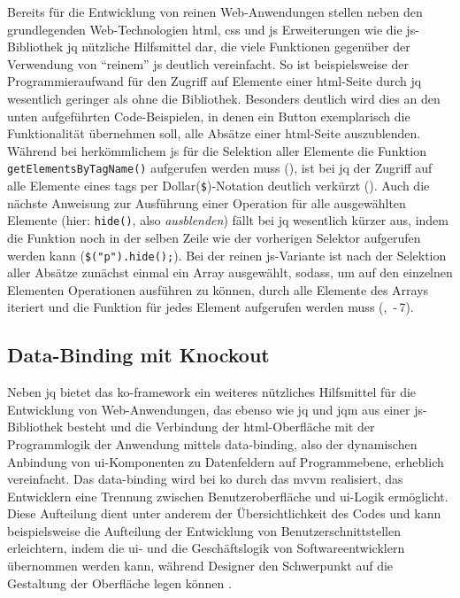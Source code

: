 Bereits für die Entwicklung von reinen Web-Anwendungen stellen neben den grundlegenden Web-Technologien \gls{html}, \gls{css} und \gls{js} Erweiterungen wie die \gls{js}-Bibliothek \gls{jq} nützliche Hilfsmittel dar, die viele Funktionen gegenüber der Verwendung von \enquote{reinem} \gls{js} deutlich vereinfacht.
So ist beispielsweise der Programmieraufwand für den Zugriff auf Elemente einer \gls{html}-Seite durch \gls{jq} wesentlich geringer als ohne die Bibliothek.
Besonders deutlich wird dies an den unten aufgeführten Code-Beispielen, in denen ein Button exemplarisch die Funktionalität übernehmen soll, alle Absätze einer \gls{html}-Seite auszublenden.
Während bei herkömmlichem \gls{js} für die Selektion aller Elemente die Funktion \lstinline|getElementsByTagName()| aufgerufen werden muss (), ist bei \gls{jq} der Zugriff auf alle Elemente eines \glspl{tag} per Dollar(\lstinline|$|)-Notation deutlich verkürzt ().
Auch die nächste Anweisung zur Ausführung einer Operation für alle ausgewählten Elemente (hier: \lstinline|hide()|, also \textit{ausblenden}) fällt bei \gls{jq} wesentlich kürzer aus, indem die Funktion noch in der selben Zeile wie der vorherigen Selektor aufgerufen werden kann (\lstinline|$("p").hide();|).
Bei der reinen \gls{js}-Variante ist nach der Selektion aller Absätze zunächst einmal ein Array ausgewählt, sodass, um auf den einzelnen Elementen Operationen ausführen zu können, durch alle Elemente des Arrays iteriert und die Funktion für jedes Element aufgerufen werden muss (, \,-\,7).


	

\subsection{Data-Binding mit Knockout} \label{sec:ko}
Neben \gls{jq} bietet das \gls{ko}-\gls{framework} ein weiteres nützliches Hilfsmittel für die Entwicklung von Web-Anwendungen, das ebenso wie \gls{jq} und \gls{jqm} aus einer \gls{js}-Bibliothek besteht und die Verbindung der \gls{html}-Oberfläche mit der Programmlogik der Anwendung mittels \gls{data-binding}, also der dynamischen Anbindung von \gls{ui}-Komponenten zu Datenfeldern auf Programmebene, erheblich vereinfacht.
Das \gls{data-binding} wird bei \gls{ko} durch das \gls{mvvm} realisiert, das Entwicklern eine Trennung zwischen Benutzeroberfläche und \gls{ui}-Logik ermöglicht.
Diese Aufteilung dient unter anderem der Übersichtlichkeit des Codes und kann beispielsweise die Aufteilung der Entwicklung von Benutzerschnittstellen erleichtern, indem die \gls{ui}- und die Geschäftslogik von Softwareentwicklern übernommen werden kann, während Designer den Schwerpunkt auf die Gestaltung der Oberfläche legen können \cite{Model_View_ViewModel__Wikipedia}.

